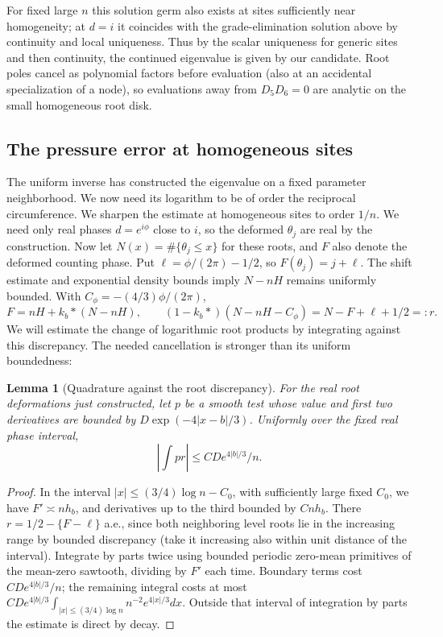 \documentclass[11pt]{article}
\numberwithin{equation}{section}
\newtheorem{lemma}[theorem]{Lemma}
\theoremstyle{definition}\newtheorem{definition}[theorem]{Definition}
\theoremstyle{remark}\newtheorem{remark}[theorem]{Remark}
\begin{document}
For fixed large \(n\) this solution germ also exists at sites sufficiently near homogeneity; at \(d=i\) it coincides with the grade-elimination solution above by continuity and local uniqueness. Thus by the scalar uniqueness for generic sites and then continuity, the continued eigenvalue is given by our candidate. Root poles cancel as polynomial factors before evaluation (also at an accidental specialization of a node), so evaluations away from \(D_5D_6=0\) are analytic on the small homogeneous root disk.

\subsection{The pressure error at homogeneous sites}

The uniform inverse has constructed the eigenvalue on a fixed parameter neighborhood. We now need its logarithm to be of order the reciprocal circumference. We sharpen the estimate at homogeneous sites to order \(1/n\). We need only real phases \(d=e^{i\phi}\) close to \(i\), so the deformed \(\theta_j\) are real by the construction. Now let \(N(x)=\#\{\theta_j\le x\}\) for these roots, and \(F\) also denote the deformed counting phase. Put \(\ell=\phi/(2\pi)-1/2\), so \(F(\theta_j)=j+\ell\). The shift estimate and exponential density bounds imply \(N-nH\) remains uniformly bounded. With \(C_\phi=-(4/3)\phi/(2\pi)\),
\[
 F=nH+k_b*(N-nH),\qquad (1-k_b*)(N-nH-C_\phi)=N-F+\ell+1/2=:r .
\]
We will estimate the change of logarithmic root products by integrating
against this discrepancy. The needed cancellation is stronger than its
uniform boundedness:
\begin{lemma}[Quadrature against the root discrepancy]
\label{L:lem:pressure-quadrature}
For the real root deformations just constructed, let $p$ be a smooth
test whose value and first two derivatives are bounded by
$D\exp(-4|x-b|/3)$. Uniformly over the fixed real phase interval,
\[
 \left|\int p r\right|\le C D e^{4|b|/3}/n .
\]
\end{lemma}
\begin{proof}
In the interval \(|x|\le(3/4)\log n-C_0\), with sufficiently large fixed \(C_0\), we have \(F'\asymp n h_b\), and derivatives up to the third bounded by \(C n h_b\). There \(r=1/2-\{F-\ell\}\) a.e., since both neighboring level roots lie in the increasing range by bounded discrepancy (take it increasing also within unit distance of the interval). Integrate by parts twice using bounded periodic zero-mean primitives of the mean-zero sawtooth, dividing by \(F'\) each time. Boundary terms cost \(C D e^{4|b|/3}/n\); the remaining integral costs at most \(C D e^{4|b|/3}\int_{|x|\le(3/4)\log n} n^{-2} e^{4|x|/3}dx\). Outside that interval of integration by parts the estimate is direct by decay.
\end{proof}
\end{document}
